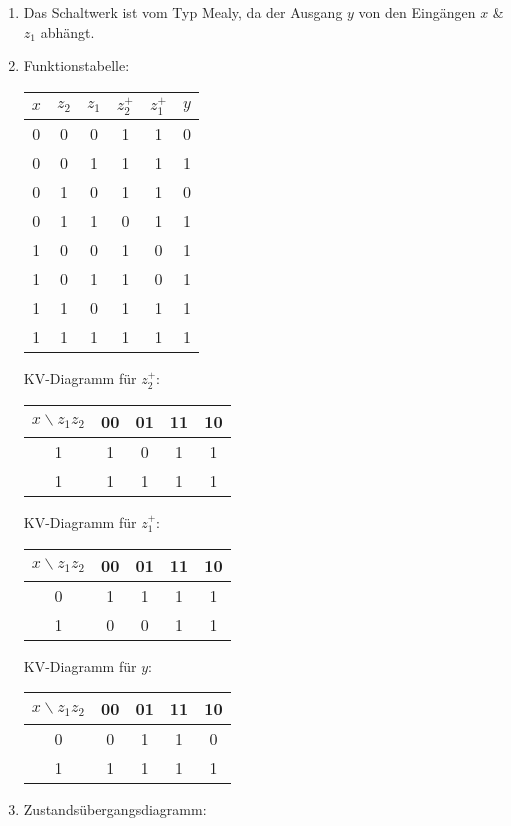 \documentclass{article}
\begin{document}
\begin{solution}
  \begin{enumerate}
    \item Das Schaltwerk ist vom Typ Mealy, da der Ausgang $y$ von den Eingängen $x$ \& $z_1$ abhängt.
    \item Funktionstabelle:
          \begin{tabular}{ccc|cc|c}
            $x$ & $z_2$ & $z_1$ & $z_2^+$ & $z_1^+$ & $y$ \\
            \hline
            0   & 0     & 0     & 1       & 1       & 0   \\
            0   & 0     & 1     & 1       & 1       & 1   \\
            0   & 1     & 0     & 1       & 1       & 0   \\
            0   & 1     & 1     & 0       & 1       & 1   \\
            1   & 0     & 0     & 1       & 0       & 1   \\
            1   & 0     & 1     & 1       & 0       & 1   \\
            1   & 1     & 0     & 1       & 1       & 1   \\
            1   & 1     & 1     & 1       & 1       & 1   \\
          \end{tabular}

          KV-Diagramm für $z_2^+$:
          \begin{tabular}{c|cccc}
            $x\backslash z_1z_2$ & 00 & 01 & 11 & 10 \\
            \hline
            1                    & 1  & 0  & 1  & 1  \\
            1                    & 1  & 1  & 1  & 1  \\
          \end{tabular}

          KV-Diagramm für $z_1^+$:
          \begin{tabular}{c|cccc}
            $x\backslash z_1z_2$ & 00 & 01 & 11 & 10 \\
            \hline
            0                    & 1  & 1  & 1  & 1  \\
            1                    & 0  & 0  & 1  & 1  \\
          \end{tabular}

          KV-Diagramm für $y$:
          \begin{tabular}{c|cccc}
            $x\backslash z_1z_2$ & 00 & 01 & 11 & 10 \\
            \hline
            0                    & 0  & 1  & 1  & 0  \\
            1                    & 1  & 1  & 1  & 1  \\
          \end{tabular}
    \item Zustandsübergangsdiagramm:
\end{enumerate}
\end{solution}
\end{document}
